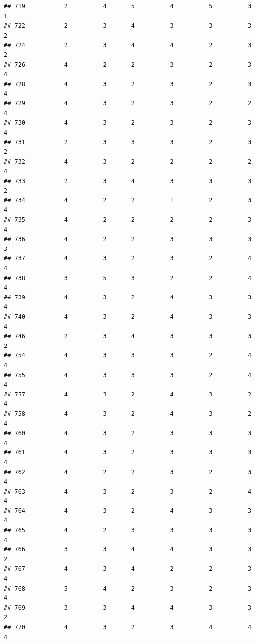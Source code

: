 \documentclass[
]{article}
\begin{document}
\begin{verbatim}
## 719           2          4       5          4          5          3        1
## 722           2          3       4          3          3          3        2
## 724           2          3       4          4          2          3        2
## 726           4          2       2          3          2          3        4
## 728           4          3       2          3          2          3        4
## 729           4          3       2          3          2          2        4
## 730           4          3       2          3          2          3        4
## 731           2          3       3          3          2          3        2
## 732           4          3       2          2          2          2        4
## 733           2          3       4          3          3          3        2
## 734           4          2       2          1          2          3        4
## 735           4          2       2          2          2          3        4
## 736           4          2       2          3          3          3        3
## 737           4          3       2          3          2          4        4
## 738           3          5       3          2          2          4        4
## 739           4          3       2          4          3          3        4
## 740           4          3       2          4          3          3        4
## 746           2          3       4          3          3          3        2
## 754           4          3       3          3          2          4        4
## 755           4          3       3          3          2          4        4
## 757           4          3       2          4          3          2        4
## 758           4          3       2          4          3          2        4
## 760           4          3       2          3          3          3        4
## 761           4          3       2          3          3          3        4
## 762           4          2       2          3          2          3        4
## 763           4          3       2          3          2          4        4
## 764           4          3       2          4          3          3        4
## 765           4          2       3          3          3          3        4
## 766           3          3       4          4          3          3        2
## 767           4          3       4          2          2          3        4
## 768           5          4       2          3          2          3        4
## 769           3          3       4          4          3          3        2
## 770           4          3       2          3          4          4        4

\end{verbatim}
\end{document}
